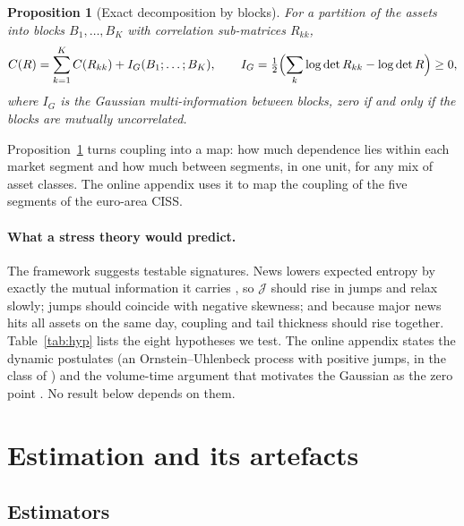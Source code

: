 \documentclass[12pt]{article}
\newtheorem{proposition}{Proposition}
\theoremstyle{definition}
\theoremstyle{remark}
\newcommand{\JJ}{\mathcal{J}}
\begin{document}
\begin{doublespace}
\begin{proposition}[Exact decomposition by blocks]
\label{prop:blocks}
For a partition of the assets into blocks $B_1,\dots,B_K$ with correlation
sub-matrices $R_{kk}$,
\begin{equation}
\label{eq:blocks}
C(R)=\sum_{k=1}^K C(R_{kk})+I_G(B_1;\dots;B_K),\qquad
I_G=\tfrac12\Bigl(\sum_k\log\det R_{kk}-\log\det R\Bigr)\ge0,
\end{equation}
where $I_G$ is the Gaussian multi-information between blocks, zero if and only
if the blocks are mutually uncorrelated.
\end{proposition}

Proposition~\ref{prop:blocks} turns coupling into a map: how much dependence
lies within each market segment and how much between segments, in one unit,
for any mix of asset classes. The online appendix uses it to map the
coupling of the five segments of the euro-area CISS.

\paragraph{What a stress theory would predict.} The framework suggests
testable signatures. News lowers expected entropy by exactly the mutual
information it carries \citep[ch.~2]{cover2006}, so $\JJ$ should rise in jumps
and relax slowly; jumps should coincide with negative skewness; and because
major news hits all assets on the same day, coupling and tail thickness should
rise together. Table~\ref{tab:hyp} lists the eight hypotheses we test. The
online appendix states the dynamic postulates (an Ornstein--Uhlenbeck process
with positive jumps, in the class of \citealp{bns2001}) and the volume-time
argument that motivates the Gaussian as the zero point
\citep{clark1973,tauchen1983,ane2000}. No result below depends on them.

\section{Estimation and its artefacts}
\label{sec:estimation}

\subsection{Estimators}


\end{doublespace}
\end{document}
